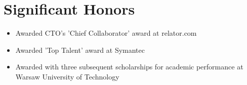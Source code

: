 \documentclass[11pt,a4paper,roman]{moderncv}       %
\begin{document}
\section{Significant Honors}
 
\begin{itemize}
    \item Awarded CTO's 'Chief Collaborator' award at relator.com
    \item Awarded 'Top Talent' award at Symantec
    \item Awarded with three subsequent scholarships for academic performance at Warsaw University of Technology
\end{itemize}

\nocite{*}



\end{document}
